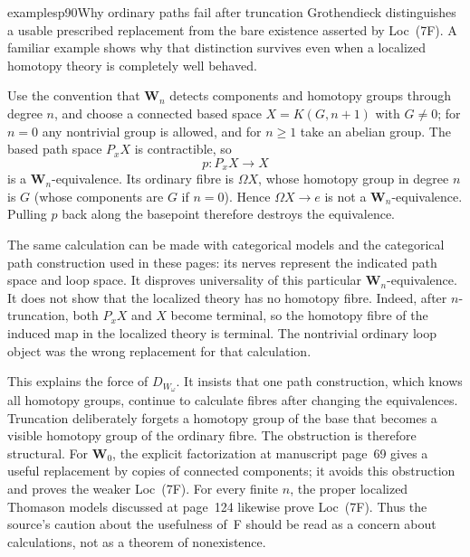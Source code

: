 \begin{dcomment}{examples}{p90}{Why ordinary paths fail after truncation}
Grothendieck distinguishes a usable prescribed replacement from the bare existence asserted by Loc~(7F). A familiar example shows why that distinction survives even when a localized homotopy theory is completely well behaved.

Use the convention that $\mathbf W_n$ detects components and homotopy groups through degree $n$, and choose a connected based space $X=K(G,n+1)$ with $G\ne0$; for $n=0$ any nontrivial group is allowed, and for $n\geq1$ take an abelian group. The based path space $P_xX$ is contractible, so
\[
 p:P_xX\longrightarrow X
\]
is a $\mathbf W_n$-equivalence. Its ordinary fibre is $\Omega X$, whose homotopy group in degree $n$ is $G$ (whose components are $G$ if $n=0$). Hence $\Omega X\to e$ is not a $\mathbf W_n$-equivalence. Pulling $p$ back along the basepoint therefore destroys the equivalence.

The same calculation can be made with categorical models and the categorical path construction used in these pages: its nerves represent the indicated path space and loop space. It disproves universality of this particular $\mathbf W_n$-equivalence. It does not show that the localized theory has no homotopy fibre. Indeed, after $n$-truncation, both $P_xX$ and $X$ become terminal, so the homotopy fibre of the induced map in the localized theory is terminal. The nontrivial ordinary loop object was the wrong replacement for that calculation.

This explains the force of $D_{W_\omega}$. It insists that one path construction, which knows all homotopy groups, continue to calculate fibres after changing the equivalences. Truncation deliberately forgets a homotopy group of the base that becomes a visible homotopy group of the ordinary fibre. The obstruction is therefore structural. For $\mathbf W_0$, the explicit factorization at manuscript page~69 gives a useful replacement by copies of connected components; it avoids this obstruction and proves the weaker Loc~(7F). For every finite $n$, the proper localized Thomason models discussed at page~124 likewise prove Loc~(7F). Thus the source's caution about the usefulness of~F should be read as a concern about calculations, not as a theorem of nonexistence.
\end{dcomment}

